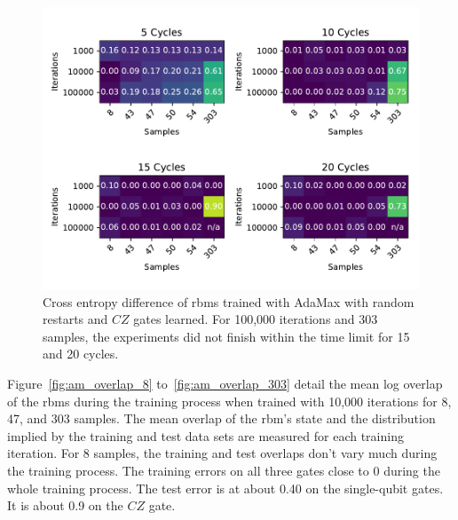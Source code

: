 \begin{figure}[H]
  \centering
  \includegraphics[width=\textwidth]{figures/results/AM-restarts-learned/fxeb_heatmap.pdf}
  \caption[Cross Entropy Difference of RBMs Trained with AdaMax with Random Restarts and $CZ$ Gates Learned]{
  Cross entropy difference of \gls{rbm}s trained with AdaMax with random restarts and $CZ$ gates learned.
  For 100,000 iterations and 303 samples, the experiments did not finish within the time limit for 15 and 20 cycles.}
  \label{fig:am_fxeb}
\end{figure}

Figure~\ref{fig:am_overlap_8} to~\ref{fig:am_overlap_303} detail the mean log overlap of the \gls{rbm}s during the 
training process when trained with 10,000 iterations for 8, 47, and 303 samples. The 
mean overlap of the \gls{rbm}'s state and the distribution implied by the training and test data sets are measured 
for each training iteration.
For 8 samples, the training and test overlaps don't vary much during the training process. The training errors on all three gates
close to 0 during the whole training process. The test error is at about 0.40 on the single-qubit gates. It is about 
0.9 on the $CZ$ gate.

